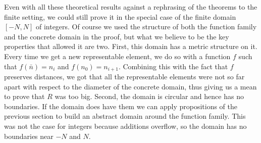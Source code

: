 Even with all these theoretical results against a rephrasing of the theorems to the finite setting, we could still prove it in the special case of the finite domain $[-N, N]$ of integers. Of course we used the structure of both the function family and the concrete domain in the proof, but what we believe to be the key properties that allowed it are two.
First, this domain has a metric structure on it. Every time we get a new representable element, we do so with a function $f$ such that $f(\bar{n}) = n_i$ and $f(n_0) = n_{i+1}$. Combining this with the fact that $f$ preserves distances, we got that all the representable elements were not so far apart with respect to the diameter of the concrete domain, thus giving us a mean to prove that $R$ was too big.
Second, the domain is circular and hence has no boundaries. If the domain does have them we can apply propositions of the previous section to build an abstract domain around the function family. This was not the case for integers because additions overflow, so the domain has no boundaries near $-N$ and $N$.


